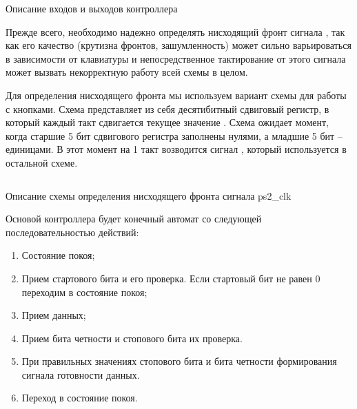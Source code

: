 \begin{listing}[H]
	\inputminted{SystemVerilog}{code_examples/lab_6/in_out.sv}
	\caption{Описание входов и выходов контроллера}
\end{listing}


\par{Прежде всего, необходимо надежно определять нисходящий фронт сигнала , так как его качество (крутизна фронтов, зашумленность) может сильно варьироваться в зависимости от клавиатуры и непосредственное тактирование от этого сигнала может вызвать некорректную работу всей схемы в целом.}

\par{Для определения нисходящего фронта мы используем вариант схемы для работы с кнопками. Схема представляет из себя десятибитный сдвиговый регистр, в который каждый такт  сдвигается текущее значение . Схема ожидает момент, когда старшие 5 бит сдвигового регистра заполнены нулями, а младшие 5 бит -- единицами. В этот момент на 1 такт возводится сигнал , который используется в остальной схеме.}

%


\begin{listing}[H]
	\inputminted{SystemVerilog}{code_examples/lab_6/clk_detect.sv}
	\caption{Описание схемы определения нисходящего фронта сигнала ps2\_clk}
\end{listing}


\par{Основой контроллера будет конечный автомат со следующей последовательностью действий:}
  \begin{enumerate}%
    \item Состояние покоя;
    \item Прием стартового бита и его проверка. Если стартовый бит не равен 0 переходим в состояние покоя;
    \item Прием данных;
    \item Прием бита четности и стопового бита их проверка.
    \item При правильных значениях стопового бита и бита четности формирования сигнала готовности данных.
    \item Переход в состояние покоя.
  \end{enumerate}

